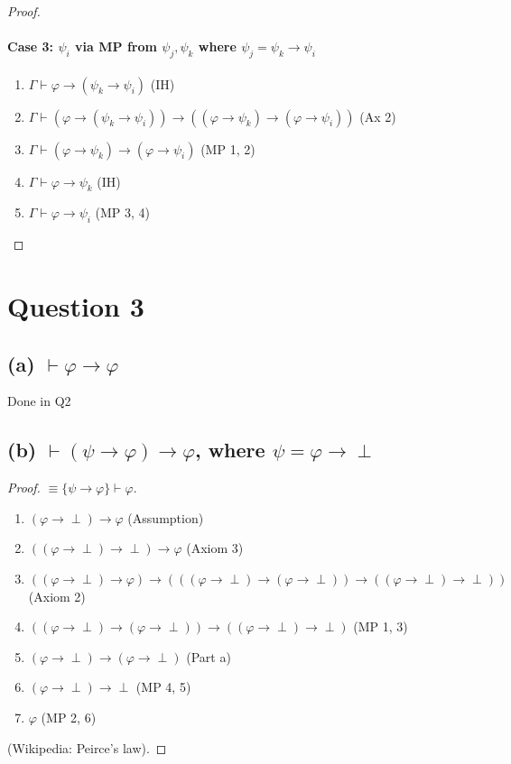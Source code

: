 \documentclass{article}
\begin{document}
\begin{proof}
    \paragraph{Case 3: $\psi_i$ via MP from $\psi_j, \psi_k$ where $\psi_j = \psi_k \rightarrow \psi_i$}
    \begin{enumerate}
        \item $\Gamma \vdash \varphi \rightarrow (\psi_k \rightarrow \psi_i)$ (IH)
        \item $\Gamma \vdash (\varphi \rightarrow (\psi_k \rightarrow \psi_i)) \rightarrow ((\varphi \rightarrow \psi_k) \rightarrow (\varphi \rightarrow \psi_i))$ (Ax 2)
        \item $\Gamma \vdash (\varphi \rightarrow \psi_k) \rightarrow (\varphi \rightarrow \psi_i)$ (MP 1, 2)
        \item $\Gamma \vdash \varphi \rightarrow \psi_k$ (IH)
        \item $\Gamma \vdash \varphi \rightarrow \psi_i$ (MP 3, 4)
    \end{enumerate}

\end{proof}
\section*{Question 3}
\subsection*{(a) $\vdash \varphi \rightarrow \varphi$}
Done in Q2

\subsection*{(b) $\vdash (\psi \rightarrow \varphi) \rightarrow \varphi$, where $\psi = \varphi \rightarrow \perp$}
\begin{proof}
    $\equiv \{\psi \rightarrow \varphi\} \vdash \varphi$.
    \begin{enumerate}
        \item $(\varphi \rightarrow \perp) \rightarrow \varphi$ (Assumption)
        \item $((\varphi \rightarrow \perp) \rightarrow \perp) \rightarrow \varphi$ (Axiom 3)
        \item $((\varphi \rightarrow \perp) \rightarrow \varphi) \rightarrow (((\varphi \rightarrow \perp) \rightarrow (\varphi \rightarrow \perp)) \rightarrow ((\varphi \rightarrow \perp) \rightarrow \perp))$ (Axiom 2)
        \item $((\varphi \rightarrow \perp) \rightarrow (\varphi \rightarrow \perp)) \rightarrow ((\varphi \rightarrow \perp) \rightarrow \perp)$ (MP 1, 3)
        \item $(\varphi \rightarrow \perp) \rightarrow (\varphi \rightarrow \perp)$ (Part a)
        \item $(\varphi \rightarrow \perp) \rightarrow \perp$ (MP 4, 5)
        \item $\varphi$ (MP 2, 6)
    \end{enumerate}
    (Wikipedia: Peirce's law).
\end{proof}
\end{document}
